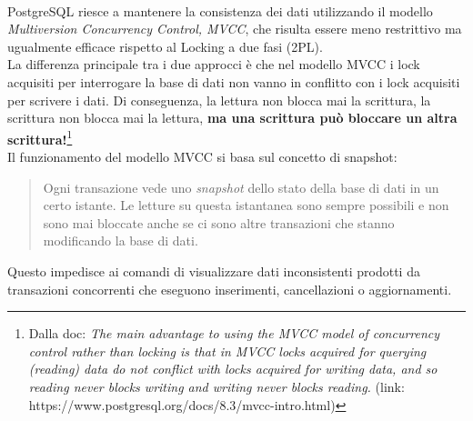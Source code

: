 \documentclass[12pt,a4paper]{book}
\begin{document}
	\paragraph{}PostgreSQL riesce a mantenere la consistenza dei dati utilizzando il modello \textit{Multiversion Concurrency Control, MVCC}, che risulta essere meno restrittivo ma ugualmente efficace rispetto al Locking a due fasi (2PL).\\
	La differenza principale tra i due approcci è che nel modello MVCC i lock acquisiti per interrogare la base di dati non vanno in conflitto con i lock acquisiti per scrivere i dati. Di conseguenza, la lettura non blocca mai la scrittura, la scrittura non blocca mai la lettura, \textbf{ma una scrittura può bloccare un altra scrittura!}\footnote{Dalla doc: \textit{The main advantage to using the MVCC model of concurrency control rather than locking is that in MVCC locks acquired for querying (reading) data do not conflict with locks acquired for writing data, and so reading never blocks writing and writing never blocks reading.} (link: https://www.postgresql.org/docs/8.3/mvcc-intro.html)}\\
	Il funzionamento del modello MVCC si basa sul concetto di snapshot:
	\begin{quotation}
		Ogni transazione vede uno \textit{snapshot} dello stato della base di dati in un certo istante. Le letture su questa istantanea sono sempre possibili e non sono mai bloccate anche se ci sono altre transazioni che stanno modificando la base di dati.
	\end{quotation}
	Questo impedisce ai comandi di visualizzare dati inconsistenti prodotti da transazioni concorrenti che eseguono inserimenti, cancellazioni o aggiornamenti.
\end{document}
